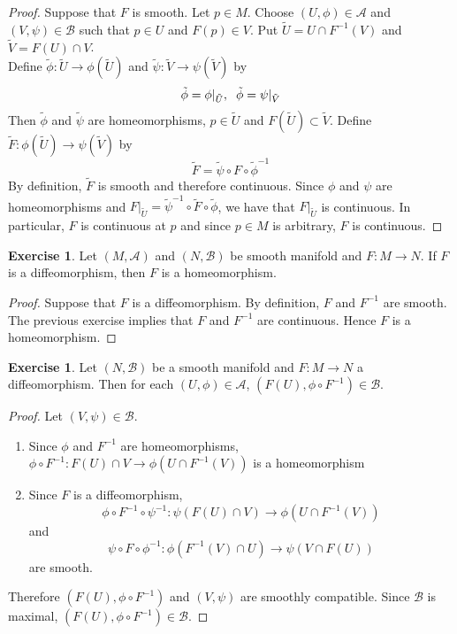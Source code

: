 \documentclass[12pt]{amsart}
\theoremstyle{definition}
\newtheorem{ex}[definition]{Exercise}
\newcommand{\MA}{\mathcal{A}}
\newcommand{\MB}{\mathcal{B}}
\newcommand{\tU}{\tilde{U}}
\newcommand{\tV}{\tilde{V}}
\newcommand{\tphi}{\tilde{\phi}}
\newcommand{\tpsi}{\tilde{\psi}}
\newcommand{\tF}{\tilde{F}}
\begin{document}
	\begin{proof}
	Suppose that $F$ is smooth. Let $p \in M$. Choose $(U, \phi) \in \MA$ and $(V, \psi) \in \MB$ such that $p \in U$ and $F(p) \in V$. Put $\tU = U \cap F^{-1}(V)$ and $\tV = F(U) \cap V$. \\
	Define $\tphi: \tU \rightarrow \phi(\tU)$ and $\tpsi: \tV \rightarrow \psi(\tV)$ by $$\tphi = \phi|_{\tU}, \hspace{.2cm} \tphi = \psi|_{\tV}$$ Then $\tphi$ and $\tpsi$ are homeomorphisms, $p \in \tU$ and $F(\tU) \subset \tV$. Define $\tF: \phi(\tU) \rightarrow \psi(\tV) $ by $$ \tF = \tpsi \circ F \circ \tphi^{-1}$$  
	By definition, $\tF$ is smooth and therefore continuous. Since $\phi$ and $\psi$ are homeomorphisms and $F|_{\tU} = \tpsi^{-1} \circ \tF \circ \tphi$, we have that $F|_{\tU}$ is continuous. In particular, $F$ is continuous at $p$ and since $p \in M$ is arbitrary, $F$ is continuous.
	\end{proof}
	
	\begin{ex}
	Let $(M, \MA)$ and $(N, \MB)$ be smooth manifold and $F: M \rightarrow N$. If $F$ is a diffeomorphism, then $F$ is a homeomorphism. 
	\end{ex}	
	
	\begin{proof}
	Suppose that $F$ is a diffeomorphism. By definition, $F$ and  $F^{-1}$ are smooth. The previous exercise implies that $F$ and $F^{-1}$ are continuous. Hence $F$  is a homeomorphism. 
	\end{proof}
	
	\begin{ex}
		Let $(N, \MB)$ be a smooth manifold and $F: M \rightarrow N$ a diffeomorphism. Then for each $(U, \phi) \in \MA$, $(F(U), \phi \circ F^{-1}) \in \MB$.
	\end{ex}
	
	\begin{proof}
		Let $(V, \psi) \in \MB$. 
		\begin{enumerate}
		\item Since $\phi$ and $F^{-1}$ are homeomorphisms, $\phi \circ F^{-1}: F(U) \cap V \rightarrow \phi(U \cap F^{-1}(V))$ is a homeomorphism
		\item Since $F$ is a diffeomorphism, $$\phi \circ F^{-1} \circ \psi^{-1}: \psi(F(U) \cap V) \rightarrow \phi(U \cap F^{-1}(V))$$ and $$\psi \circ F \circ \phi^{-1}: \phi(F^{-1}(V) \cap U) \rightarrow \psi(V \cap F(U))$$ are smooth. 
		\end{enumerate}
		
		Therefore $(F(U), \phi \circ F^{-1})$ and $(V, \psi)$ are smoothly compatible. Since $\MB$ is maximal, $(F(U), \phi \circ F^{-1}) \in \MB$.
	\end{proof}
\end{document}
